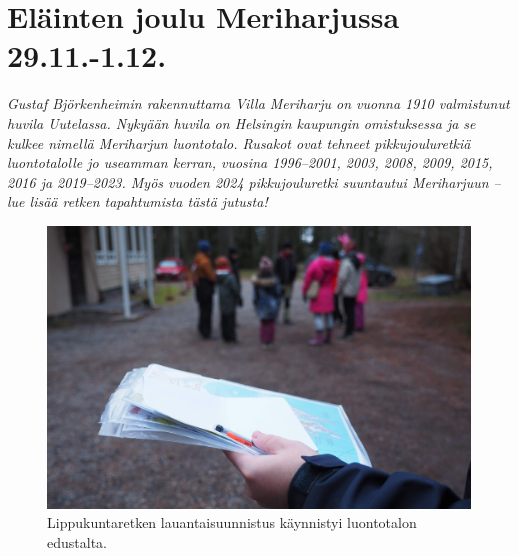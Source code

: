 \section{Eläinten joulu Meriharjussa 29.11.-1.12.}

\textit{Gustaf Björkenheimin rakennuttama Villa Meriharju on vuonna 1910 
valmistunut huvila Uutelassa. Nykyään huvila on Helsingin kaupungin 
omistuksessa ja se kulkee nimellä Meriharjun luontotalo. Rusakot ovat tehneet 
pikkujouluretkiä luontotalolle jo useamman kerran, vuosina 1996--2001, 2003, 
2008, 2009, 2015, 2016 ja 2019--2023. Myös vuoden 2024 pikkujouluretki 
suuntautui Meriharjuun -- lue lisää retken tapahtumista tästä jutusta!}

\begin{figure}[!b]
\centering\includegraphics[width=\textwidth]{assets/meriharjuSuunnistus}
\caption{Lippukuntaretken lauantaisuunnistus käynnistyi luontotalon edustalta.}
\end{figure}

